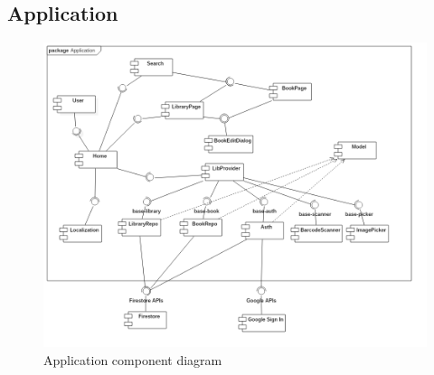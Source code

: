 \subsection{Application}
\begin{figure}[!h]
    \centering
    \includegraphics[scale=0.4]{images/application-component-diagram.png}
    \caption{Application component diagram}
    \label{ref:applicationcomponentdiagram}
\end{figure}

